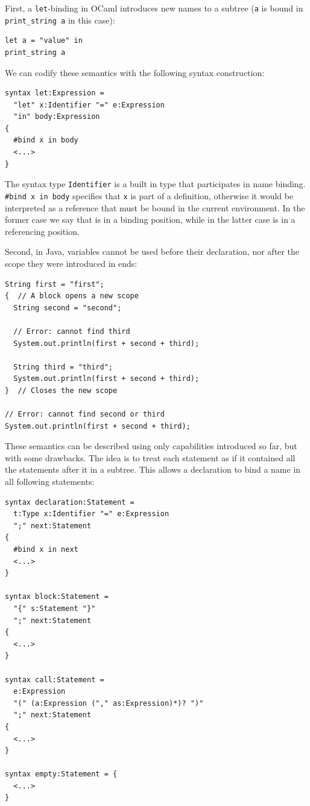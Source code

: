 \documentclass{kththesis}
\begin{document}
First, a \texttt{let}-binding in OCaml introduces new names to a subtree (\texttt{a} is bound in \texttt{print_string a} in this case):

\begin{verbatim}
let a = "value" in
print_string a
\end{verbatim}

We can codify these semantics with the following syntax construction:

\begin{verbatim}
syntax let:Expression =
  "let" x:Identifier "=" e:Expression
  "in" body:Expression
{
  #bind x in body
  <...>
}
\end{verbatim}

The syntax type \texttt{Identifier} is a built in type that participates in name binding. \texttt{#bind x in body} specifies that \texttt{x} is part of a definition, otherwise it would be interpreted as a reference that must be bound in the current environment. In the former case we say that  is in a binding position, while in the latter case  is in a referencing position.

Second, in Java, variables cannot be used before their declaration, nor after the scope they were introduced in ends:

\begin{verbatim}
String first = "first";
{  // A block opens a new scope
  String second = "second";

  // Error: cannot find third
  System.out.println(first + second + third);

  String third = "third";
  System.out.println(first + second + third);
}  // Closes the new scope

// Error: cannot find second or third
System.out.println(first + second + third);
\end{verbatim}

These semantics can be described using only capabilities introduced so far, but with some drawbacks. The idea is to treat each statement as if it contained all the statements after it in a subtree. This allows a declaration to bind a name in all following statements:

\begin{verbatim}
syntax declaration:Statement =
  t:Type x:Identifier "=" e:Expression
  ";" next:Statement
{
  #bind x in next
  <...>
}

syntax block:Statement =
  "{" s:Statement "}"
  ";" next:Statement
{
  <...>
}

syntax call:Statement =
  e:Expression
  "(" (a:Expression ("," as:Expression)*)? ")"
  ";" next:Statement
{
  <...>
}

syntax empty:Statement = {
  <...>
}
\end{verbatim}
\end{document}
